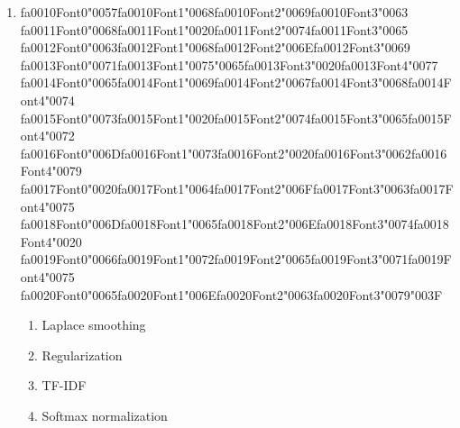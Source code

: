 \documentclass[12pt]{article}
\begin{document}
\begin{enumerate}[label=Q\arabic*.]
\begin{enumerate}[label=(\Alph*)]
    \item Generative models are less explainable
\end{enumerate}
\item {\csname fa0010Font0\endcsname\char"0057}{\csname fa0010Font1\endcsname\char"0068}{\csname fa0010Font2\endcsname\char"0069}{\csname fa0010Font3\endcsname\char"0063} {\csname fa0011Font0\endcsname\char"0068}{\csname fa0011Font1\endcsname\char"0020}{\csname fa0011Font2\endcsname\char"0074}{\csname fa0011Font3\endcsname\char"0065} {\csname fa0012Font0\endcsname\char"0063}{\csname fa0012Font1\endcsname\char"0068}{\csname fa0012Font2\endcsname\char"006E}{\csname fa0012Font3\endcsname\char"0069} {\csname fa0013Font0\endcsname\char"0071}{\csname fa0013Font1\endcsname\char"0075}{\char"0065}{\csname fa0013Font3\endcsname\char"0020}{\csname fa0013Font4\endcsname\char"0077} {\csname fa0014Font0\endcsname\char"0065}{\csname fa0014Font1\endcsname\char"0069}{\csname fa0014Font2\endcsname\char"0067}{\csname fa0014Font3\endcsname\char"0068}{\csname fa0014Font4\endcsname\char"0074} {\csname fa0015Font0\endcsname\char"0073}{\csname fa0015Font1\endcsname\char"0020}{\csname fa0015Font2\endcsname\char"0074}{\csname fa0015Font3\endcsname\char"0065}{\csname fa0015Font4\endcsname\char"0072} {\csname fa0016Font0\endcsname\char"006D}{\csname fa0016Font1\endcsname\char"0073}{\csname fa0016Font2\endcsname\char"0020}{\csname fa0016Font3\endcsname\char"0062}{\csname fa0016Font4\endcsname\char"0079} {\csname fa0017Font0\endcsname\char"0020}{\csname fa0017Font1\endcsname\char"0064}{\csname fa0017Font2\endcsname\char"006F}{\csname fa0017Font3\endcsname\char"0063}{\csname fa0017Font4\endcsname\char"0075} {\csname fa0018Font0\endcsname\char"006D}{\csname fa0018Font1\endcsname\char"0065}{\csname fa0018Font2\endcsname\char"006E}{\csname fa0018Font3\endcsname\char"0074}{\csname fa0018Font4\endcsname\char"0020} {\csname fa0019Font0\endcsname\char"0066}{\csname fa0019Font1\endcsname\char"0072}{\csname fa0019Font2\endcsname\char"0065}{\csname fa0019Font3\endcsname\char"0071}{\csname fa0019Font4\endcsname\char"0075} {\csname fa0020Font0\endcsname\char"0065}{\csname fa0020Font1\endcsname\char"006E}{\csname fa0020Font2\endcsname\char"0063}{\csname fa0020Font3\endcsname\char"0079}{\char"003F}
\begin{enumerate}[label=(\Alph*)]
    \item Laplace smoothing
    \item Regularization
    \item TF-IDF
    \item Softmax normalization

\end{enumerate}
\end{enumerate}
\end{document}

